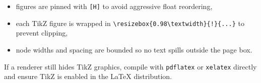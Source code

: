 \documentclass[11pt]{article}
\begin{document}
\begin{itemize}[leftmargin=*]
  \item figures are pinned with \texttt{[H]} to avoid aggressive float reordering,
  \item each TikZ figure is wrapped in \texttt{\textbackslash resizebox\{0.98\textbackslash textwidth\}\{!\}\{...\}} to prevent clipping,
  \item node widths and spacing are bounded so no text spills outside the page box.
\end{itemize}

If a renderer still hides TikZ graphics, compile with \texttt{pdflatex} or \texttt{xelatex} directly and ensure TikZ is enabled in the LaTeX distribution.
\end{document}

